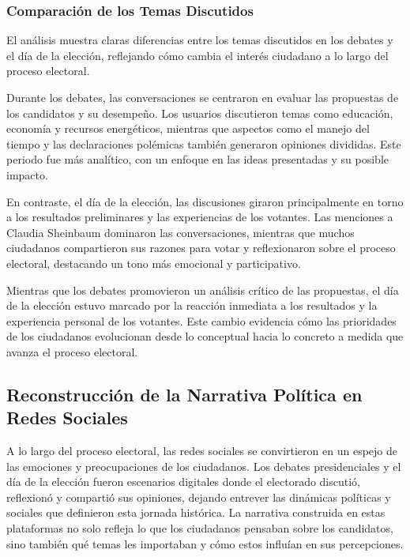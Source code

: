 \documentclass[10pt, a4paper]{article}
\begin{document}
	\subsubsection{Comparación de los Temas Discutidos}
	
	El análisis muestra claras diferencias entre los temas discutidos en los debates y el día de la elección, reflejando cómo cambia el interés ciudadano a lo largo del proceso electoral.
	
	Durante los debates, las conversaciones se centraron en evaluar las propuestas de los candidatos y su desempeño. Los usuarios discutieron temas como educación, economía y recursos energéticos, mientras que aspectos como el manejo del tiempo y las declaraciones polémicas también generaron opiniones divididas. Este periodo fue más analítico, con un enfoque en las ideas presentadas y su posible impacto.
	
	En contraste, el día de la elección, las discusiones giraron principalmente en torno a los resultados preliminares y las experiencias de los votantes. Las menciones a Claudia Sheinbaum dominaron las conversaciones, mientras que muchos ciudadanos compartieron sus razones para votar y reflexionaron sobre el proceso electoral, destacando un tono más emocional y participativo.
	
	Mientras que los debates promovieron un análisis crítico de las propuestas, el día de la elección estuvo marcado por la reacción inmediata a los resultados y la experiencia personal de los votantes. Este cambio evidencia cómo las prioridades de los ciudadanos evolucionan desde lo conceptual hacia lo concreto a medida que avanza el proceso electoral.
	
	\subsection{Reconstrucción de la Narrativa Política en Redes Sociales}
	
	A lo largo del proceso electoral, las redes sociales se convirtieron en un espejo de las emociones y preocupaciones de los ciudadanos. Los debates presidenciales y el día de la elección fueron escenarios digitales donde el electorado discutió, reflexionó y compartió sus opiniones, dejando entrever las dinámicas políticas y sociales que definieron esta jornada histórica. La narrativa construida en estas plataformas no solo refleja lo que los ciudadanos pensaban sobre los candidatos, sino también qué temas les importaban y cómo estos influían en sus percepciones.
	
\end{document}
